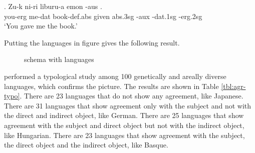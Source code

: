 \exg. Zu-k ni-ri liburu-a emon  -aus  .\\
 you-\ac{erg} me-\ac{dat} book-\ac{def}.\ac{abs} given \ac{abs}.3\ac{sg} -\ac{aux} -\ac{dat}.1\ac{sg} -\ac{erg}.2\ac{sg}\\
 `You gave me the book.' \label{ex:basque-agr}

Putting the languages in  figure gives the following result.

 \begin{figure}[ht]
   \centering
   \caption{ schema with languages}
   \label{fig:agr-sub-do-io-lang}
 \end{figure}

\citet{gilligan1987} performed a typological study among 100 genetically and areally diverse languages, which confirms the picture. The results are shown in Table \ref{tbl:agr-typo}. There are 23 languages that do not show any agreement, like Japanese. There are 31 languages that show agreement only with the subject and not with the direct and indirect object, like German. There are 25 languages that show agreement with the subject and direct object but not with the indirect object, like Hungarian. There are 23 languages that show agreement with the subject, the direct object and the indirect object, like Basque.

